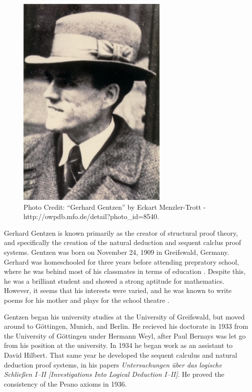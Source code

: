 \documentclass[../../../include/open-logic-section]{subfiles}
\begin{document}

\begin{figure}[h!] 
\centering
\includegraphics[scale=0.75]{gerhard-gentzen.jpg} 
\caption{Photo Credit: ``Gerhard Gentzen'' by Eckart Menzler-Trott - 
http://owpdb.mfo.de/detail?photo_id=8540.}
\end{figure}

Gerhard Gentzen is known primarily as the creator of structural proof
theory, and specifically the creation of the natural deduction and 
sequent calclus proof systems. Gentzen was born on November 24, 1909 in 
Greifswald, Germany. Gerhard was homeschooled for three years before 
attending prepratory school, where he was behind most of his classmates in
 terms of education \citep[12]{Menzler-Trott2007}. Despite this, he was a
 brilliant student and showed a strong aptitude for mathematics. However,
it seems that his interests were varied, and he was known to write poems for 
his mother and plays for the school theatre \citep[11, 13]{Menzler-Trott2007}.

Gentzen began his university studies at the University of Greifswald, but
moved around to G\"{o}ttingen, Munich, and Berlin. He recieved his
doctorate in 1933 from the University of G\"{o}ttingen under Hermann Weyl,
after Paul Bernays was let go from his position at the university.
In 1934 he began work as an assistant to David Hilbert. That same year he
developed the sequent calculus and natural deduction proof systems, in his
papers \emph{Untersuchungen \"{u}ber das logische Schlie\ss en
I--II [Investigations Into Logical Deduction I--II]}. He proved the consistency
 of the Peano axioms in 1936.
\end{document}
